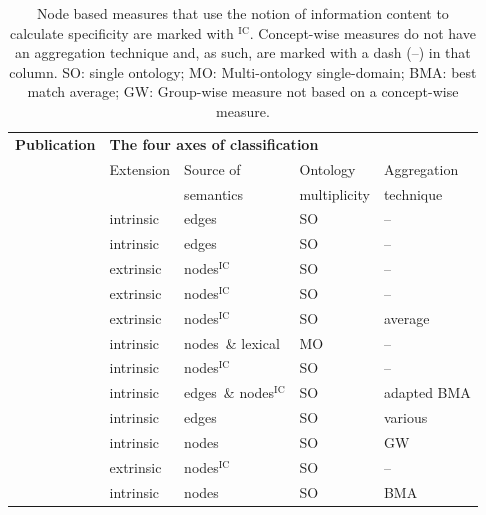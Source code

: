 \begin{table}

\def\int{intrinsic}
\def\ext{extrinsic}
\def\intext{\int\ \& \ext}

\def\e{edges}
\def\n{nodes}
\def\ic{$^\textrm{IC}$}

\caption[Summary of the characteristics of some semantic similarity measures]{Node based measures that use the notion of information content to calculate specificity are marked with \ic. Concept-wise measures do not have an aggregation technique and, as such, are marked with a dash (--) in that column. SO: single ontology; MO: Multi-ontology single-domain; BMA: best match average; GW: Group-wise measure not based on a concept-wise measure.}
\label{tab:summary-ssm}

\centering
\small
\begin{tabular}{lllll}
\toprule
\bfseries Publication &
\multicolumn{4}{l}{\bfseries The four axes of classification} \\
\cmidrule{2-5}
  & Extension & Source of & Ontology     & Aggregation \\
  &           & semantics & multiplicity & technique   \\
\midrule
\citep{Rada1989}      & \int    & \e             & SO & --          \\
\citep{Wu1994}        & \int    & \e             & SO & --          \\
\citep{Resnik1995}    & \ext    & \n\ic          & SO & --          \\
\citep{Jiang1997}     & \ext    & \n\ic          & SO & --          \\
\citep{Lord2003}      & \ext    & \n\ic          & SO & average     \\
\citep{Rodriguez2003} & \int    & \n\ \& lexical & MO & --          \\
\citep{Seco2004}      & \int    & \n\ic          & SO & --          \\
\citep{Clemente2005}  & \int    & \e\ \& \n\ic   & SO & adapted BMA \\
\citep{Lei2006}       & \int    & \e             & SO & various     \\
\citep{Gentleman2007} & \int    & \n             & SO & GW          \\
\citep{Couto2007}     & \ext    & \n\ic          & SO & --          \\
\citep{Wang2007}      & \int    & \n             & SO & BMA         \\

\end{tabular}
\end{table}
